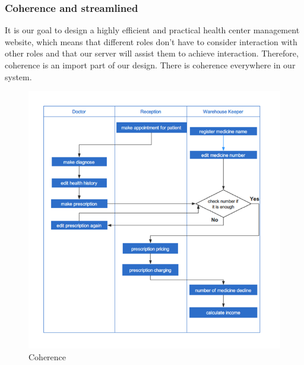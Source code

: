 \subsubsection{Coherence and streamlined}
It is our goal to design a highly efficient and practical health center management website, which means that different roles don’t have to consider interaction with other roles and that our server will assist them to achieve interaction. Therefore, coherence is an import part of our design. There is coherence everywhere in our system.
\begin{figure}[H]
    \centering
    \includegraphics[width=\textwidth]{fp/s2.png}
    \caption{Coherence}
    \label{fig:sp2}
\end{figure}
